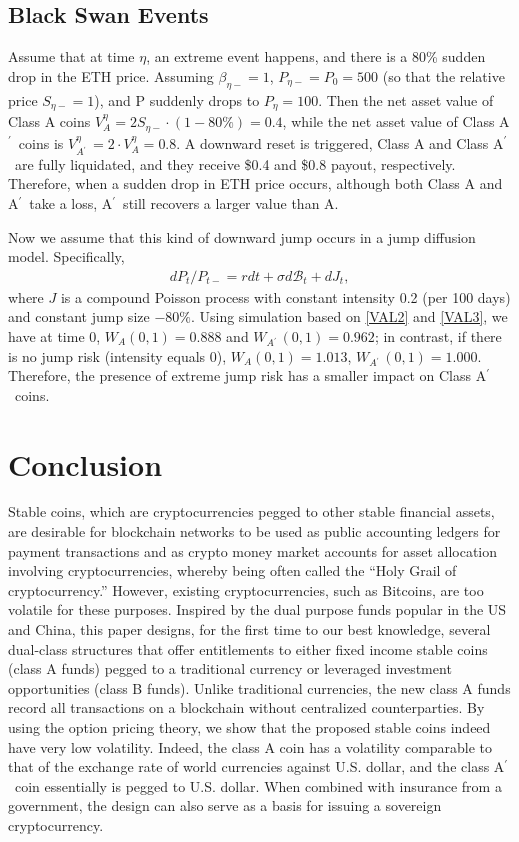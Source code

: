 \documentclass[draft, noinfoline]{ectaart}
\numberwithin{equation}{section}
\theoremstyle{plain}
\newcommand{\Ap}{A\ensuremath{^\prime}~}
\begin{document}
\subsection{Black Swan Events}
Assume that at time $\eta$, an extreme event happens, and there is a 80\% sudden drop in the ETH price. Assuming $\beta_{\eta-} = 1$, $P_{\eta-} = P_0 = 500$ (so that the relative price $S_{\eta−} = 1$), and P suddenly drops to $P_\eta = 100$. Then the net asset value of Class A coins $V_A^\eta = 2S_{\eta-} \cdot(1-80\%) = 0.4$, while the net asset value of Class \Ap coins is $V^\eta_{\Ap} = 2 \cdot V^\eta_A = 0.8$. A downward reset is triggered, Class A and Class \Ap are fully liquidated, and they receive \$0.4 and \$0.8 payout, respectively. Therefore, when a sudden drop in ETH price occurs, although both Class A and \Ap take a loss, \Ap still recovers a larger value than A.

Now we assume that this kind of downward jump occurs in a jump diffusion model. Specifically,
\begin{align*}
dP_{t}/P_{t-}=r dt+\sigma d\mathcal{B}_{t}+ dJ_t,
\end{align*}
where $J$ is a compound Poisson process with constant intensity 0.2 (per 100 days) and constant jump size $-80\%$. Using simulation based on \eqref{VAL2} and \eqref{VAL3}, we have at time 0, $W_A(0,1) = 0.888$ and $W_{\Ap} (0,1) = 0.962$; in contrast, if there is no jump risk (intensity equals 0), $W_A(0,1) = 1.013$, $W_{\Ap} (0,1) = 1.000$. Therefore, the presence of extreme jump risk has a smaller impact on Class \Ap coins.


\section{Conclusion}
Stable coins, which are cryptocurrencies pegged to other stable financial assets, are desirable for blockchain networks to be used as public accounting ledgers for payment transactions  and as crypto money market accounts for asset allocation involving cryptocurrencies, whereby being often called the ``Holy Grail of cryptocurrency.'' However, existing cryptocurrencies, such as Bitcoins, are too volatile for these purposes. Inspired by the dual purpose funds popular in the US and China, this paper designs, for the first time to our best knowledge, several dual-class structures that offer entitlements to either fixed income stable coins (class A funds) pegged to a traditional currency or leveraged investment opportunities (class B funds). Unlike traditional currencies, the new class A funds record all transactions on a blockchain without centralized counterparties. By using the option pricing theory, we show that the proposed stable coins indeed have very low volatility. Indeed, the class A coin has a volatility comparable to that of the exchange rate of world currencies against U.S. dollar, and the class \Ap coin essentially is pegged to U.S. dollar. When combined with insurance from a government, the design can also serve as a basis for issuing a sovereign cryptocurrency.
\end{document}
